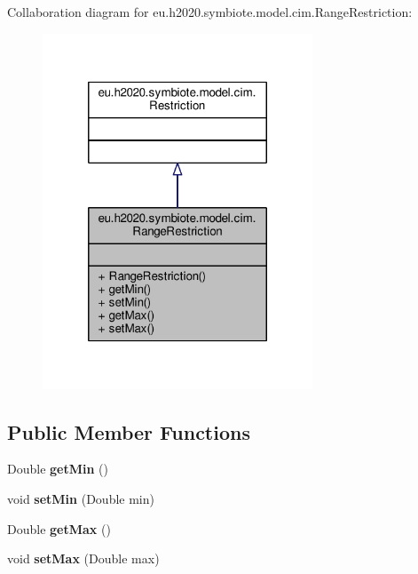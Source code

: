 Collaboration diagram for eu.\+h2020.\+symbiote.\+model.\+cim.\+Range\+Restriction\+:
\nopagebreak
\begin{figure}[H]
\begin{center}
\leavevmode
\includegraphics[width=228pt]{classeu_1_1h2020_1_1symbiote_1_1model_1_1cim_1_1RangeRestriction__coll__graph}
\end{center}
\end{figure}
\subsection*{Public Member Functions}
\begin{DoxyCompactItemize}
\item 
\mbox{\label{classeu_1_1h2020_1_1symbiote_1_1model_1_1cim_1_1RangeRestriction_a6dc6668f2e20f865de8459ffbc904089}} 
Double {\bfseries get\+Min} ()
\item 
\mbox{\label{classeu_1_1h2020_1_1symbiote_1_1model_1_1cim_1_1RangeRestriction_a53bf726192aa3cc682a8cd5deb84e5b7}} 
void {\bfseries set\+Min} (Double min)
\item 
\mbox{\label{classeu_1_1h2020_1_1symbiote_1_1model_1_1cim_1_1RangeRestriction_aee5a8e8259f14eeb1e8a47eabb46002c}} 
Double {\bfseries get\+Max} ()
\item 
\mbox{\label{classeu_1_1h2020_1_1symbiote_1_1model_1_1cim_1_1RangeRestriction_a43281f59c9db80ed85487da7e708c282}} 
void {\bfseries set\+Max} (Double max)
\end{DoxyCompactItemize}


